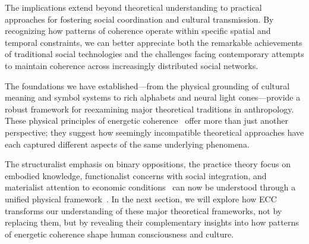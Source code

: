 The implications extend beyond theoretical understanding to practical approaches for fostering social coordination and cultural transmission. By recognizing how patterns of coherence operate within specific spatial and temporal constraints, we can better appreciate both the remarkable achievements of traditional social technologies and the challenges facing contemporary attempts to maintain coherence across increasingly distributed social networks.

The foundations we have established—from the physical grounding of cultural meaning and symbol systems to rich alphabets and neural light cones—provide a robust framework for reexamining major theoretical traditions in anthropology. These physical principles of energetic coherence~ offer more than just another perspective; they suggest how seemingly incompatible theoretical approaches have each captured different aspects of the same underlying phenomena.

The structuralist emphasis on binary oppositions, the practice theory focus on embodied knowledge, functionalist concerns with social integration, and materialist attention to economic conditions~ can now be understood through a unified physical framework~\cite{levistrauss1963structural,bourdieu1990logic,durkheim1995elementary,godelier1986mental}. In the next section, we will explore how ECC transforms our understanding of these major theoretical frameworks, not by replacing them, but by revealing their complementary insights into how patterns of energetic coherence shape human consciousness and culture.

